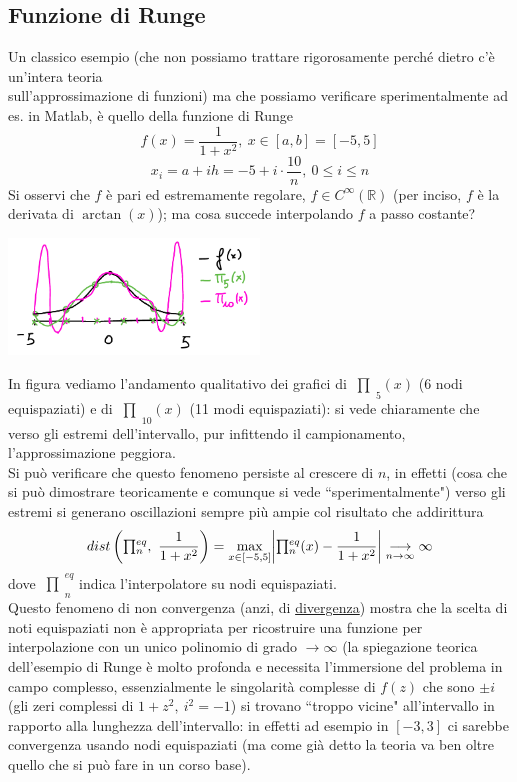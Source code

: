 \documentclass[12pt,headings=optiontohead]{article}
\DeclarePairedDelimiter{\abs}{\lvert}{\rvert}
\newcommand{\inter}{\begin{matrix}\prod\end{matrix}}
\begin{document}
\subsection{Funzione di Runge}
Un classico esempio (che non possiamo trattare rigorosamente perché dietro c'è un'intera teoria\\ sull'approssimazione di funzioni) ma che possiamo verificare sperimentalmente ad es. in Matlab, è quello della funzione di Runge
\[ f(x) = \frac{1}{1+x^2}, \ x \in [a,b] = [-5,5] \]
\[ x_i = a+ih = -5+i \cdot \frac{10}{n}, \ 0 \leq i \leq n \]
Si osservi che $f$ è pari ed estremamente
regolare, $f \in C^\infty (\mathbb{R})$ (per inciso, $f$ è la derivata di $\arctan(x)$); ma cosa succede interpolando $f$ a passo costante?
\begin{center}
    \includegraphics[width=0.5\textwidth]{lez12_img5.png}
\end{center}
In figura vediamo l'andamento qualitativo dei grafici di $\inter_5(x)$ (6 nodi equispaziati) e di $\inter_{10}(x)$ (11 modi equispaziati): si vede chiaramente che verso gli estremi dell'intervallo, pur infittendo il campionamento, l'approssimazione peggiora.\\
Si può verificare che questo fenomeno persiste al crescere di $n$, in effetti (cosa che si può dimostrare teoricamente e comunque si vede ``sperimentalmente") verso gli estremi si generano oscillazioni sempre più ampie col risultato che addirittura
\[ dist\left(\inter_n^{eq},\ \frac{1}{1+x^2}\right) = \max_{x \in [-5,5]} \abs*{\inter_n^{eq}(x) - \frac{1}{1+x^2}}\underset{n \to \infty}{\longrightarrow} \infty \]
dove $\inter_n^{eq}$ indica l'interpolatore su nodi equispaziati.\\
Questo fenomeno di non convergenza (anzi, di \uline{divergenza}) mostra che la scelta di noti equispaziati non è appropriata per ricostruire una funzione per interpolazione con un unico polinomio di grado $\to \infty$
(la spiegazione teorica dell'esempio di Runge è molto profonda e necessita l'immersione del problema in campo complesso, essenzialmente le singolarità complesse di $f(z)$ che sono $\pm i$ (gli zeri complessi di $1+z^2, \ i^2 = -1$) si trovano ``troppo vicine" all'intervallo in rapporto alla lunghezza dell'intervallo: in effetti ad esempio in $[-3,3]$ ci sarebbe convergenza usando nodi equispaziati (ma come già detto la teoria va ben oltre quello che si può fare in un corso base).\\
\end{document}
